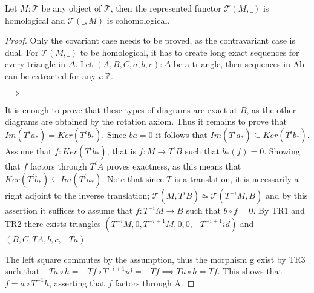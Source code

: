     \begin{lemma}
        Let $M:\mathcal{T}$ be any object of $\mathcal{T}$, then the represented functor $\mathcal{T}(M,\_)$ is homological and $\mathcal{T}(\_,M)$ is cohomological.
    \end{lemma}

    \begin{proof}
        Only the covariant case needs to be proved, as the contravariant case is dual. For $\mathcal{T}(M,\_)$ to be homological, it has to create long exact sequences for every triangle in $\Delta$. Let $(A,B,C,a,b,c):\Delta$ be a triangle, then sequences in Ab can be extracted for any $i:\mathbb{Z}$.

        \begin{center}
             $\implies$
        \end{center}

        It is enough to prove that these types of diagrams are exact at $B$, as the other diagrams are obtained by the rotation axiom. Thus it remains to prove that $Im(T^ia_*)=Ker(T^ib_*)$. Since $ba=0$ it follows that $Im(T^ia_*) \subseteq Ker(T^ib_*)$. Assume that $f:Ker(T^ib_*)$, that is $f:M\rightarrow T^iB$ such that $b_*(f)=0$. Showing that $f$ factors through $T^iA$ proves exactness, as this means that $Ker(T^ib_*)\subseteq Im(T^ia_*)$. Note that since $T$ is a translation, it is necessarily a right adjoint to the inverse translation; $\mathcal{T}(M,T^iB) \simeq\mathcal{T}(T^{-i}M,B)$ and by this assertion it suffices to assume that $f:T^{-i}M\rightarrow B$ such that $b\circ f = 0$. By TR1 and TR2 there exists triangles $(T^{-i}M,0,T^{-i+1}M,0,0,-T^{-i+1}id)$ and $(B,C,TA,b,c,-Ta)$. 
        \begin{center}
        \end{center}
        The left square commutes by the assumption, thus the morphism g exist by TR3 such that $-Ta\circ h = -Tf\circ T^{-i+1}id = -Tf \implies Ta\circ h = Tf$. This shows that $f = a\circ T^{-1}h$, asserting that $f$ factors through A.
    \end{proof}
